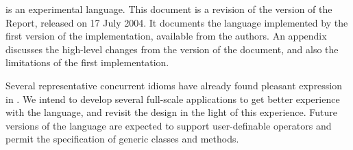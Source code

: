 
\Xten{} is an experimental language. This document is a revision
of the {} version of the Report, released on 17 July 2004. It
documents the language implemented by the first version of the
implementation, available from the authors. An appendix discusses the
high-level changes from the {} version of the document, and
also the limitations of the first implementation.

Several representative concurrent idioms have already found pleasant
expression in \Xten. We intend to develop several full-scale
applications to get better experience with the language, and revisit
the design in the light of this experience. Future versions of the
language are expected to support user-definable operators and permit
the specification of generic classes and methods.


